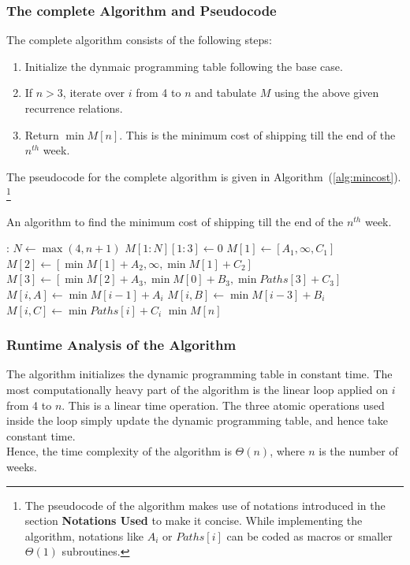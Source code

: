 \documentclass[12pt]{report}
\begin{document}
    \subsubsection*{The complete Algorithm and Pseudocode}
    The complete algorithm consists of the following steps:
    \begin{enumerate}
        \item Initialize the dynmaic programming table following the base case.
        \item If $n > 3$, iterate over $i$ from 4 to $n$ and tabulate $M$ using the above given recurrence relations.
        \item Return $\min{M[n]}$. This is the minimum cost of shipping till the end of the $n^{th}$ week.
    \end{enumerate}
    The pseudocode for the complete algorithm is given in Algorithm~(\ref{alg:mincost}).
    \footnote{
        The pseudocode of the algorithm makes use of notations introduced in the section \textbf{Notations Used} to make it concise.
        While implementing the algorithm, notations like $A_{i}$ or $Paths[i]$ can be coded as macros or smaller $\Theta(1)$ subroutines.
    }

    \begin{algorithm}
        \caption{An algorithm to find the minimum cost of shipping till the end of the $n^{th}$ week.}
        \label{alg:mincost}
        \begin{algorithmic}[1]
            :
                \State $N \gets \max{(4, n+1)}$
                \State $M[1:N][1:3] \gets 0$
                \State $M[1] \gets [A_{1}, \infty, C_{1}]$
                \State $M[2] \gets [\min{M[1]} + A_{2}, \infty, \min{M[1]} + C_{2}]$
                \State $M[3] \gets [\min{M[2]} + A_{3}, \min{M[0]} + B_{3}, \min{Paths[3]} + C_{3}]$
                        \State $M[i, A] \gets \min{M[i-1]} + A_{i}$
                        \State $M[i, B] \gets \min{M[i-3]} + B_{i}$
                        \State $M[i, C] \gets \min{Paths[i]} + C_{i}$
                    \EndFor
                \EndIf
                \State \Return $\min{M[n]}$
            \EndProcedure
        \end{algorithmic}
    \end{algorithm}

    \subsubsection*{Runtime Analysis of the Algorithm}
    The algorithm initializes the dynamic programming table in constant time.
    The most computationally heavy part of the algorithm is the linear loop applied on $i$ from 4 to $n$.
    This is a linear time operation.
    The three atomic operations used inside the loop simply update the dynamic programming table, and hence take constant time.
    \vspace*{10pt} \\
    Hence, the time complexity of the algorithm is $\Theta(n)$, where $n$ is the number of weeks.
    \vfill
    \pagebreak
\end{document}
